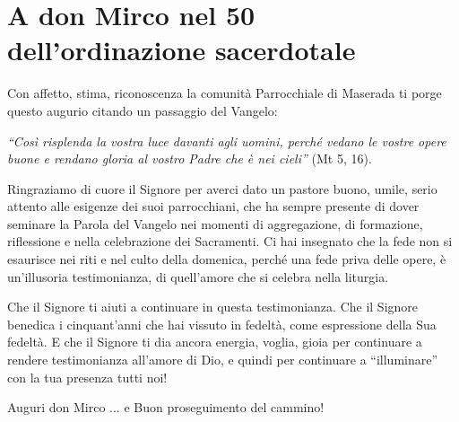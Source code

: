 \section{A don Mirco nel 50\degree{}  dell'ordinazione sacerdotale}


Con affetto, stima, riconoscenza la comunità Parrocchiale di Maserada ti porge questo augurio citando un passaggio del Vangelo:

\textit{``Così risplenda la vostra luce davanti agli uomini, perché vedano le vostre opere buone e rendano gloria al vostro Padre che è nei cieli''} (Mt 5, 16).

Ringraziamo di cuore il Signore per averci dato un pastore buono, umile, serio attento alle esigenze dei suoi parrocchiani, che ha sempre presente di dover seminare la Parola del Vangelo nei momenti di aggregazione, di formazione, riflessione e nella celebrazione dei Sacramenti. Ci hai insegnato che la fede non si esaurisce nei riti e nel culto della domenica, perché una fede priva delle opere, è un’illusoria testimonianza, di quell’amore che si celebra nella liturgia.

Che il Signore ti aiuti a continuare in questa testimonianza. Che il Signore benedica i cinquant’anni che hai vissuto in fedeltà, come espressione della Sua fedeltà. E che il Signore ti dia ancora energia, voglia, gioia per continuare a rendere testimonianza all’amore di Dio, e quindi per continuare a ``illuminare'' con la tua presenza tutti noi!

Auguri don Mirco ... e Buon proseguimento del cammino!

